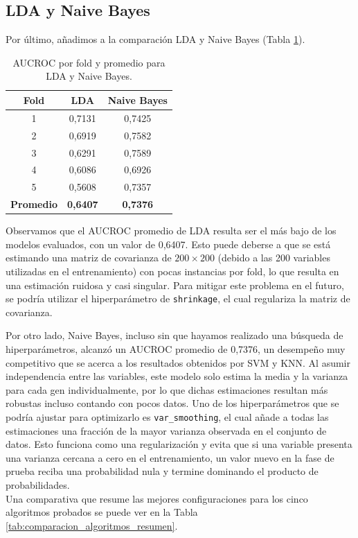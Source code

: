 \documentclass[10pt,a4paper]{article}
\begin{document}
\subsection{LDA y Naive Bayes}
Por último, añadimos a la comparación LDA y Naive Bayes (Tabla \ref{tab:aucroc_lda_nb}).

\begin{table}[H]
\centering
\begin{tabular}{c|cc}
\toprule
\textbf{Fold} & \textbf{LDA} & \textbf{Naive Bayes} \\
\midrule
1 & 0,7131 & 0,7425 \\
2 & 0,6919 & 0,7582 \\
3 & 0,6291 & 0,7589 \\
4 & 0,6086 & 0,6926 \\
5 & 0,5608 & 0,7357 \\
\midrule
\textbf{Promedio} & \textbf{0,6407} & \textbf{0,7376} \\
\bottomrule
\end{tabular}
\caption{AUCROC por fold y promedio para LDA y Naive Bayes.}
\label{tab:aucroc_lda_nb}
\end{table}

Observamos que el AUCROC promedio de LDA resulta ser el más bajo de los modelos evaluados, con un valor de 0,6407. Esto puede deberse a que se está estimando una matriz de covarianza de $200 \times 200$ (debido a las 200 variables utilizadas en el entrenamiento) con pocas instancias por fold, lo que resulta en una estimación ruidosa y casi singular. Para mitigar este problema en el futuro, se podría utilizar el hiperparámetro de \texttt{shrinkage}, el cual regulariza la matriz de covarianza.

Por otro lado, Naive Bayes, incluso sin que hayamos realizado una búsqueda de hiperparámetros, alcanzó un AUCROC promedio de 0,7376, un desempeño muy competitivo que se acerca a los resultados obtenidos por SVM y KNN. Al asumir independencia entre las variables, este modelo solo estima la media y la varianza para cada gen individualmente, por lo que dichas estimaciones resultan más robustas incluso contando con pocos datos. Uno de los hiperparámetros que se podría ajustar para optimizarlo es \texttt{var\_smoothing}, el cual añade a todas las estimaciones una fracción de la mayor varianza observada en el conjunto de datos. Esto funciona como una regularización y evita que si una variable presenta una varianza cercana a cero en el entrenamiento, un valor nuevo en la fase de prueba reciba una probabilidad nula y termine dominando el producto de probabilidades.
\\
Una comparativa que resume las mejores configuraciones para los cinco algoritmos probados se puede ver en la Tabla \ref{tab:comparacion_algoritmos_resumen}.
\end{document}
